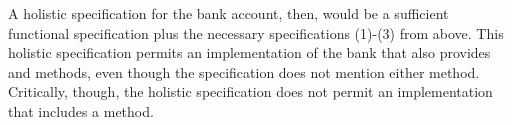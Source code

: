 A  holistic  specification for the bank account, then,
would be a sufficient functional specification
plus the necessary
specifications (1)-(3) from above. %
This holistic specification
permits an implementation of the bank that also provides  
and  methods, even though the specification does not mention either method.
Critically, though, the holistic \Chainmail specification
does not permit an
implementation that includes a  method.

 
%
